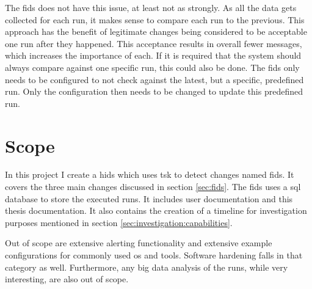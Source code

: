 The \gls{fids} does not have this issue, at least not as strongly. As all the data gets collected for each run, it makes sense to compare each run to the previous. This approach has the benefit of legitimate changes being considered to be acceptable one run after they happened. This acceptance results in overall fewer messages, which increases the importance of each. If it is required that the system should always compare against one specific run, this could also be done. The \gls{fids} only needs to be configured to not check against the latest, but a specific, predefined run. Only the configuration then needs to be changed to update this predefined run. 

\section{Scope}

In this project I create a \gls{hids} which uses \gls{tsk} to detect changes named \gls{fids}. It covers the three main changes discussed in section \ref{sec:fids}. The \gls{fids} uses a \gls{sql} database to store the executed runs. It includes user documentation and this thesis documentation. It also contains the creation of a timeline for investigation purposes mentioned in section \ref{sec:investigation:capabilities}.

Out of scope are extensive alerting functionality and extensive example configurations for commonly used \gls{os} and tools. Software hardening falls in that category as well. Furthermore, any big data analysis of the runs, while very interesting, are also out of scope.


